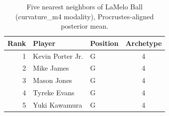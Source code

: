\begin{table}[htbp]
  \centering\small
  \begin{tabular}{rllc}
    \toprule
    Rank & Player & Position & Archetype \\
    \midrule
    1 & Kevin Porter Jr. & G & 4 \\
    2 & Mike James & G & 4 \\
    3 & Mason Jones & G & 4 \\
    4 & Tyreke Evans & G & 4 \\
    5 & Yuki Kawamura & G & 4 \\
    \bottomrule
  \end{tabular}
  \caption{Five nearest neighbors of LaMelo Ball (curvature_m4 modality), Procrustes-aligned posterior mean.}
  \label{tab:LaMelo_Ball_neighbors_curvature_m4}
\end{table}

